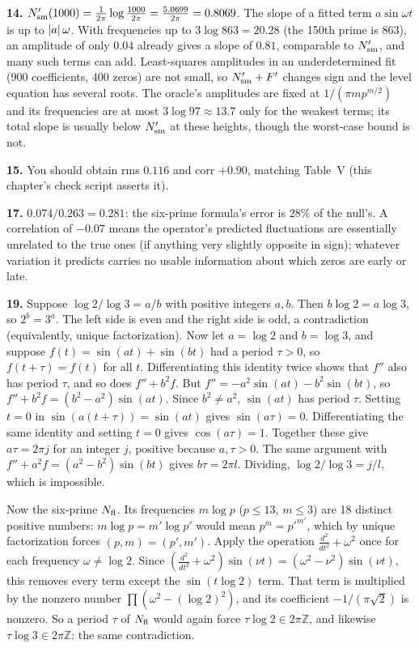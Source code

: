 \textbf{14.} $N_{\mathrm{sm}}'(1000)=\frac1{2\pi}\log\frac{1000}{2\pi}=\frac{5.0699}{2\pi}=0.8069$. The slope of a fitted term $a\sin\omega t$ is up to $\left\lvert a\right\rvert\omega$. With frequencies up to $3\log863=20.28$ (the 150th prime is $863$), an amplitude of only $0.04$ already gives a slope of $0.81$, comparable to $N_{\mathrm{sm}}'$, and many such terms can add. Least-squares amplitudes in an underdetermined fit (900 coefficients, 400 zeros) are not small, so $N_{\mathrm{sm}}'+F'$ changes sign and the level equation has several roots. The oracle's amplitudes are fixed at $1/(\pi mp^{m/2})$ and its frequencies are at most $3\log97\approx13.7$ only for the weakest terms; its total slope is usually below $N_{\mathrm{sm}}'$ at these heights, though the worst-case bound is not.

\textbf{15.} You should obtain rms $0.116$ and corr $+0.90$, matching Table~V (this chapter's check script asserts it).

\textbf{17.} $0.074/0.263=0.281$: the six-prime formula's error is $28\%$ of the null's. A correlation of $-0.07$ means the operator's predicted fluctuations are essentially unrelated to the true ones (if anything very slightly opposite in sign); whatever variation it predicts carries no usable information about which zeros are early or late.

\textbf{19.} Suppose $\log2/\log3=a/b$ with positive integers $a,b$. Then $b\log2=a\log3$, so $2^b=3^a$. The left side is even and the right side is odd, a contradiction (equivalently, unique factorization). Now let $a=\log2$ and $b=\log3$, and suppose $f(t)=\sin(at)+\sin(bt)$ had a period $\tau>0$, so $f(t+\tau)=f(t)$ for all $t$. Differentiating this identity twice shows that $f''$ also has period $\tau$, and so does $f''+b^2f$. But $f''=-a^2\sin(at)-b^2\sin(bt)$, so $f''+b^2f=(b^2-a^2)\sin(at)$. Since $b^2\ne a^2$, $\sin(at)$ has period $\tau$. Setting $t=0$ in $\sin(a(t+\tau))=\sin(at)$ gives $\sin(a\tau)=0$. Differentiating the same identity and setting $t=0$ gives $\cos(a\tau)=1$. Together these give $a\tau=2\pi j$ for an integer $j$, positive because $a,\tau>0$. The same argument with $f''+a^2f=(a^2-b^2)\sin(bt)$ gives $b\tau=2\pi l$. Dividing, $\log2/\log3=j/l$, which is impossible.

Now the six-prime $N_{\mathrm{fl}}$. Its frequencies $m\log p$ ($p\le13$, $m\le3$) are 18 distinct positive numbers: $m\log p=m'\log p'$ would mean $p^m=p'^{m'}$, which by unique factorization forces $(p,m)=(p',m')$. Apply the operation $\frac{d^2}{dt^2}+\omega^2$ once for each frequency $\omega\ne\log2$. Since $(\frac{d^2}{dt^2}+\omega^2)\sin(\nu t)=(\omega^2-\nu^2)\sin(\nu t)$, this removes every term except the $\sin(t\log2)$ term. That term is multiplied by the nonzero number $\prod(\omega^2-(\log2)^2)$, and its coefficient $-1/(\pi\sqrt2)$ is nonzero. So a period $\tau$ of $N_{\mathrm{fl}}$ would again force $\tau\log2\in2\pi\mathbb{Z}$, and likewise $\tau\log3\in2\pi\mathbb{Z}$: the same contradiction.

